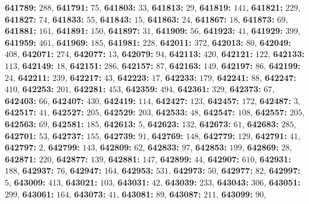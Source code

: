 \textsf{\bfseries 641789:} $288$, \textsf{\bfseries 641791:} $75$, \textsf{\bfseries 641803:} $33$, \textsf{\bfseries 641813:} $29$, \textsf{\bfseries 641819:} $141$, \textsf{\bfseries 641821:} $229$, \textsf{\bfseries 641827:} $74$, \textsf{\bfseries 641833:} $55$, \textsf{\bfseries 641843:} $15$, \textsf{\bfseries 641863:} $24$, \textsf{\bfseries 641867:} $18$, \textsf{\bfseries 641873:} $69$, \textsf{\bfseries 641881:} $161$, \textsf{\bfseries 641891:} $150$, \textsf{\bfseries 641897:} $31$, \textsf{\bfseries 641909:} $56$, \textsf{\bfseries 641923:} $41$, \textsf{\bfseries 641929:} $399$, \textsf{\bfseries 641959:} $461$, \textsf{\bfseries 641969:} $185$, \textsf{\bfseries 641981:} $228$, \textsf{\bfseries 642011:} $372$, \textsf{\bfseries 642013:} $80$, \textsf{\bfseries 642049:} $408$, \textsf{\bfseries 642071:} $274$, \textsf{\bfseries 642077:} $13$, \textsf{\bfseries 642079:} $94$, \textsf{\bfseries 642113:} $420$, \textsf{\bfseries 642121:} $122$, \textsf{\bfseries 642133:} $113$, \textsf{\bfseries 642149:} $18$, \textsf{\bfseries 642151:} $286$, \textsf{\bfseries 642157:} $87$, \textsf{\bfseries 642163:} $149$, \textsf{\bfseries 642197:} $86$, \textsf{\bfseries 642199:} $24$, \textsf{\bfseries 642211:} $239$, \textsf{\bfseries 642217:} $43$, \textsf{\bfseries 642223:} $17$, \textsf{\bfseries 642233:} $179$, \textsf{\bfseries 642241:} $88$, \textsf{\bfseries 642247:} $410$, \textsf{\bfseries 642253:} $201$, \textsf{\bfseries 642281:} $453$, \textsf{\bfseries 642359:} $494$, \textsf{\bfseries 642361:} $329$, \textsf{\bfseries 642373:} $67$, \textsf{\bfseries 642403:} $66$, \textsf{\bfseries 642407:} $430$, \textsf{\bfseries 642419:} $114$, \textsf{\bfseries 642427:} $123$, \textsf{\bfseries 642457:} $172$, \textsf{\bfseries 642487:} $3$, \textsf{\bfseries 642517:} $41$, \textsf{\bfseries 642527:} $205$, \textsf{\bfseries 642529:} $203$, \textsf{\bfseries 642533:} $48$, \textsf{\bfseries 642547:} $108$, \textsf{\bfseries 642557:} $205$, \textsf{\bfseries 642563:} $69$, \textsf{\bfseries 642581:} $185$, \textsf{\bfseries 642613:} $5$, \textsf{\bfseries 642623:} $132$, \textsf{\bfseries 642673:} $61$, \textsf{\bfseries 642683:} $285$, \textsf{\bfseries 642701:} $53$, \textsf{\bfseries 642737:} $155$, \textsf{\bfseries 642739:} $91$, \textsf{\bfseries 642769:} $148$, \textsf{\bfseries 642779:} $129$, \textsf{\bfseries 642791:} $41$, \textsf{\bfseries 642797:} $2$, \textsf{\bfseries 642799:} $143$, \textsf{\bfseries 642809:} $62$, \textsf{\bfseries 642833:} $97$, \textsf{\bfseries 642853:} $199$, \textsf{\bfseries 642869:} $28$, \textsf{\bfseries 642871:} $220$, \textsf{\bfseries 642877:} $139$, \textsf{\bfseries 642881:} $147$, \textsf{\bfseries 642899:} $44$, \textsf{\bfseries 642907:} $610$, \textsf{\bfseries 642931:} $188$, \textsf{\bfseries 642937:} $76$, \textsf{\bfseries 642947:} $164$, \textsf{\bfseries 642953:} $531$, \textsf{\bfseries 642973:} $50$, \textsf{\bfseries 642977:} $82$, \textsf{\bfseries 642997:} $5$, \textsf{\bfseries 643009:} $413$, \textsf{\bfseries 643021:} $103$, \textsf{\bfseries 643031:} $42$, \textsf{\bfseries 643039:} $233$, \textsf{\bfseries 643043:} $306$, \textsf{\bfseries 643051:} $299$, \textsf{\bfseries 643061:} $164$, \textsf{\bfseries 643073:} $41$, \textsf{\bfseries 643081:} $89$, \textsf{\bfseries 643087:} $211$, \textsf{\bfseries 643099:} $90$, 
